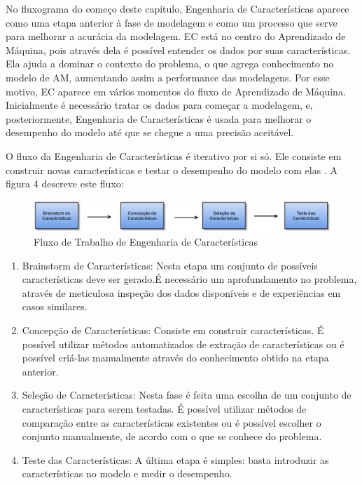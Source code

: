 No fluxograma do começo deste capítulo, Engenharia de Características aparece como uma etapa anterior à fase de modelagem e como um processo que serve para melhorar a acurácia da modelagem. EC está no centro do Aprendizado de Máquina, pois através dela é possível entender os dados por suas características. Ela ajuda a dominar o contexto do problema, o que agrega conhecimento no modelo de AM, aumentando assim a performance das modelagens. Por esse motivo, EC aparece em vários momentos do fluxo de Aprendizado de Máquina. Inicialmente é necessário tratar os dados para começar a modelagem, e, posteriormente, Engenharia de Características é usada para melhorar o desempenho do modelo até que se chegue a uma precisão aceitável. 

O fluxo da Engenharia de Características é iterativo por si só. Ele consiste em construir novas características e testar o desempenho do modelo com elas  \cite{fe2014}. A figura 4 descreve este fluxo:


\begin{figure}[!h]
\centering
\includegraphics[keepaspectratio=true,scale=0.32]
{figuras/ecworflow.eps}
\caption{Fluxo de Trabalho de Engenharia de Características}
\label{workflow_ec}
\end{figure}

\begin{enumerate}
\item Brainstorm de Características: Nesta etapa um conjunto de possíveis características deve ser gerado.É necessário um aprofundamento no problema, através de meticulosa inspeção dos dados disponíveis e de experiências em casos similares. 
\item Concepção de Características: Consiste em construir características. É possível utilizar métodos automatizados de extração de características ou é possível criá-las manualmente através do conhecimento obtido na etapa anterior.
\item Seleção de Características: Nesta fase é feita uma escolha de um conjunto de características para serem testadas. É possível utilizar métodos de comparação entre as características existentes ou é possível escolher o conjunto  manualmente, de acordo com o que se conhece do problema.
\item Teste das Características: A última etapa é simples: basta introduzir as características no modelo e medir o desempenho.
\end{enumerate}

